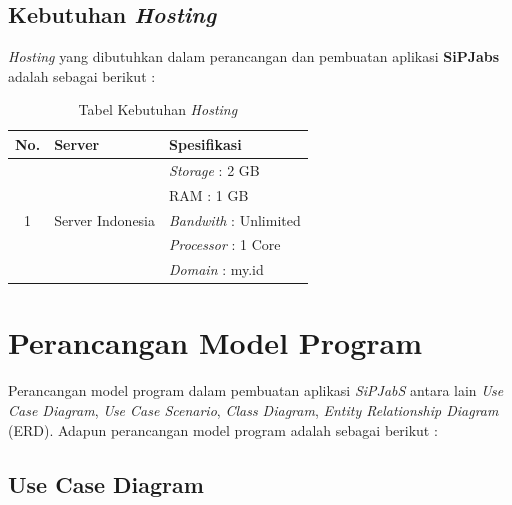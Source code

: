 \subsection{Kebutuhan \textit{Hosting}}

\textit{Hosting} yang dibutuhkan dalam perancangan dan pembuatan aplikasi\textbf{ SiPJabs}
adalah sebagai berikut :

\begin{table}[H]
	\centering
	\caption{Tabel Kebutuhan \textit{Hosting}}
	\begin{tabular}{ | c |  p{54mm} | p{64mm} | }
		\hline
		No. & Server & Spesifikasi \\
		\hline
		\multirow{5}{*}{1} & \multirow{5}{*}{Server Indonesia} & \textit{Storage} : 2 GB \\
		& & RAM : 1 GB \\
		& & \textit{Bandwith} : Unlimited \\
		& & \textit{Processor} : 1 Core \\
		& & \textit{Domain} : my.id  \\
	
		\hline
	\end{tabular}
\end{table}

\section{Perancangan Model Program}
Perancangan model program dalam pembuatan aplikasi \textit{SiPJabS} antara
lain \textit{Use Case Diagram}, \textit{Use Case Scenario}, \textit{Class Diagram},
\textit{Entity Relationship Diagram} (ERD). Adapun perancangan model program adalah sebagai berikut :

\subsection{Use Case Diagram}

